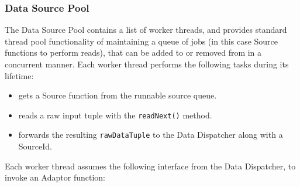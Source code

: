 \documentclass[14pt]{article}
\newcommand{\comment}[1]{}
\begin{document}
\comment{
Data Sources Admin receives two function handles one to a data Reader and
another one for a Data Adaptor from a Compiler. First Admin locks Data Adaptors
and inserts a new Data Adaptor. Then Admin locks Data Readers Queue and a handle
is inserted. Each Data Readers handle implements a method \emph{readNext()} for
reading data from some data source (typically a socket or a file).

\begin{itemize}
	\item {\tt rawDataTuple getNext(); // user defined function - provided}
\end{itemize}

\noindent The {\tt rawDataTuple} is a pair {\tt <size, bit-string>}.

The Reader extracts the informations from either a file or a socket. Reader's
communication with the outside world is in a standard format. On a read request,
Reader first reads a header containing the information about the message
followed by the message itself. For now we assume that a header is an integer
containing the number of byte to be read. Once the read is completed the size
and message are forwarded to Data Structures Dispatch.

}


\subsubsection{Data Source Pool}

The Data Source Pool contains a list of worker threads, and provides standard
thread pool functionality of maintaining a queue of jobs (in this case Source
functions to perform reads), that can be added to or removed from in a
concurrent manner. Each worker thread performs the following tasks during its
lifetime:
\begin{itemize}
\item gets a Source function from the runnable source queue.
\item reads a raw input tuple with the \texttt{readNext()} method.
\item forwards the resulting \texttt{rawDataTuple} to the Data Dispatcher along
  with a SourceId.
\end{itemize}

\noindent Each worker thread assumes the following interface from the Data
Dispatcher, to invoke an Adaptor function:
\end{document}
